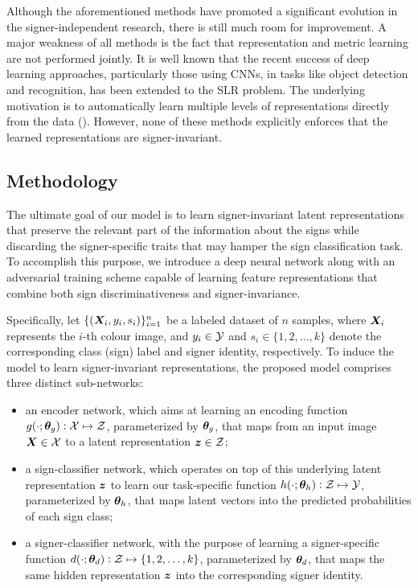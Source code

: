 Although the aforementioned methods have promoted a significant evolution in the signer-independent research, there is still much room for improvement. A major weakness of all methods is the fact that representation and metric learning are not performed jointly. It is well known that the recent success of deep learning approaches, particularly those using CNNs, in tasks like object detection and recognition, has been extended to the SLR problem. The underlying motivation is to automatically learn multiple levels of representations directly from the data (\citet{Pigou2015, Koller2016, Wu2016, Neverova2016, Kumar2017}). However, none of these methods explicitly enforces that the learned representations are signer-invariant.

\subsection{Methodology}
\label{sec:adv_signer_inv_method}

The ultimate goal of our model is to learn signer-invariant latent representations that preserve the relevant part of the information about the signs while discarding the signer-specific traits that may hamper the sign classification task. To accomplish this purpose, we introduce a deep neural network along with an adversarial training scheme capable of learning feature representations that combine both sign discriminativeness and signer-invariance.

Specifically, let $\{({\bm{X}}_{i},y_{i},s_{i})\}_{i=1}^{n}$ be a labeled dataset of $n$ samples, where ${\bm{X}}_{i}$ represents the $i$-th colour image, and $y_{i} \in {\mathcal{Y}}$ and $s_{i} \in \{1,2,\dots,k\}$ denote the corresponding class (sign) label and signer identity, respectively. To induce the model to learn signer-invariant representations, the proposed model comprises three distinct sub-networks:
\begin{itemize}
    \item an encoder network, which aims at learning an encoding function $g(\cdot;{\bm{\theta}}_g): {\mathcal{X}} \mapsto {\mathcal{Z}}$, parameterized by ${\bm{\theta}}_g$, that maps from an input image ${\bm{X}} \in {\mathcal{X}}$ to a latent representation ${\bm{z}} \in {\mathcal{Z}}$;
    \item a sign-classifier network, which operates on top of this underlying latent representation ${\bm{z}}$ to learn our task-specific function $h(\cdot; {\bm{\theta}}_h): {\mathcal{Z}} \mapsto {\mathcal{Y}}$, parameterized by ${\bm{\theta}}_h$, that maps latent vectors into the predicted probabilities of each sign class;
    \item a signer-classifier network, with the purpose of learning a signer-specific function $d(\cdot; {\bm{\theta}}_d): {\mathcal{Z}} \mapsto \{1,2,\dots,k\}$, parameterized by ${\bm{\theta}}_d$, that maps the same hidden representation ${\bm{z}}$ into the corresponding signer identity.
\end{itemize}

